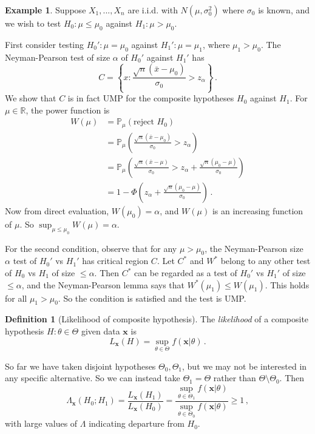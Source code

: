 \documentclass[a4paper,11pt]{article}
\theoremstyle{definition}
\newtheorem*{defn}{Definition}
\newtheorem*{ex}{Example}
\numberwithin{equation}{section}
\begin{document}
\begin{ex}
Suppose $X_1,...,X_n$ are i.i.d. with $N(\mu,\sigma_0^2)$ where $\sigma_0$ is known, and we wish to test $H_0:\mu\leq\mu_0$ against $H_1:\mu>\mu_0$.

First consider testing $H_0':\mu=\mu_0$ against $H_1':\mu=\mu_1$, where $\mu_1>\mu_0$. The Neyman-Pearson test of size $\alpha$ of $H_0'$ against $H_1'$ has
\[
C=\left\{x:\frac{\sqrt{n}(\bar{x}-\mu_0)}{\sigma_0}>z_\alpha\right\}\,.
\]
We show that $C$ is in fact UMP for the composite hypotheses $H_0$ against $H_1$. For $\mu\in\mathbb{R}$, the power function is 
\begin{align*}
    W(\mu)&=\mathbb{P}_\mu(\text{reject }H_0)\\
    &=\mathbb{P}_\mu\left(\frac{\sqrt{n}(\bar{x}-\mu_0)}{\sigma_0}>z_\alpha\right)\\
    &=\mathbb{P}_\mu\left(\frac{\sqrt{n}(\bar{x}-\mu)}{\sigma_0}>z_\alpha+\frac{\sqrt{n}(\mu_0-\mu)}{\sigma_0}\right)\\
    &=1-\Phi\left(z_\alpha+\frac{\sqrt{n}(\mu_0-\mu)}{\sigma_0}\right)\,.
\end{align*}
Now from direct evaluation, $W(\mu_0)=\alpha$, and $W(\mu)$ is an increasing function of $\mu$. So $\sup_{\mu\leq\mu_0}W(\mu)=\alpha$.

For the second condition, observe that for any $\mu>\mu_0$, the Neyman-Pearson size $\alpha$ test of $H_0'$ vs $H_1'$ has critical region $C$. Let $C^*$  and $W^*$ belong to any other test of $H_0$ vs $H_1$ of size $\leq\alpha$. Then $C^*$ can be regarded as a test of $H_0'$ vs $H_1'$ of size $\leq\alpha$, and the Neyman-Pearson lemma says that $W^*(\mu_1)\leq W(\mu_1)$. This holds for all $\mu_1>\mu_0$. So the condition is satisfied and the test is UMP.
\end{ex}

\begin{defn}[Likelihood of composite hypothesis]
The \emph{likelihood} of a composite hypothesis $H:\theta\in\Theta$ given data $\mathbf{x}$ is
\[
L_\mathbf{x}(H)=\sup_{\theta\in\Theta}f(\mathbf{x}|\theta)\,.
\]
\end{defn}

So far we have taken disjoint hypotheses $\Theta_0,\Theta_1$, but we may not be interested in any specific alternative. So we can instead take $\Theta_1=\Theta$ rather than $\Theta\setminus\Theta_0$. Then
\[
\Lambda_\mathbf{x}(H_0;H_1)=\frac{L_\mathbf{x}(H_1)}{L_\mathbf{x}(H_0)}=\frac{\sup_{\theta\in\Theta_1} f(\mathbf{x}|\theta)}{\sup_{\theta\in\Theta_0} f(\mathbf{x}|\theta)}\geq 1\,,
\]
with large values of $\Lambda$ indicating departure from $H_0$.
\end{document}
